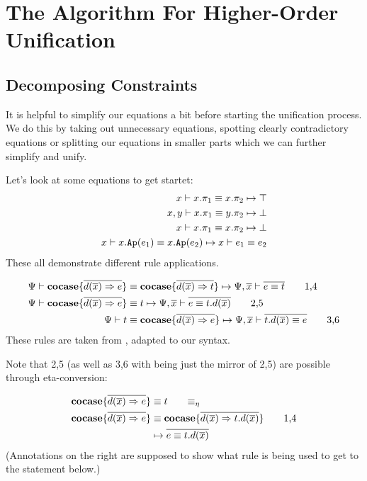 \documentclass[twoside,12pt,a4paper]{article}
\begin{document}
\section{The Algorithm For Higher-Order Unification}

\subsection{Decomposing Constraints}

It is helpful to simplify our equations a bit before starting the unification process.
We do this by taking out unnecessary equations, spotting clearly contradictory equations or splitting our equations in smaller parts which we can further simplify and unify.

Let's look at some equations to get startet:
\begin{align*}
    x \vdash x.\pi_1 \equiv x.\pi_2 \mapsto \top\\
    x,y \vdash x.\pi_1 \equiv y.\pi_2 \mapsto \bot \\
    x \vdash x.\pi_1 \equiv x.\pi_2 \mapsto \bot \\
    x \vdash x.\texttt{Ap}(e_1)\equiv x.\texttt{Ap}(e_2) \mapsto x\vdash e_1\equiv e_2
\end{align*}
These all demonstrate different rule applications.

\begin{align*}
    \Psi\vdash \textbf{cocase}\{\overline{d(\overline{x})\Rightarrow e}\}&\equiv 
    \textbf{cocase}\{\overline{d(\overline{x})\Rightarrow t}\}
    \mapsto \Psi, \overline{x}\vdash \overline{e \equiv t}\tag*{1,4}\\
    \Psi\vdash \textbf{cocase}\{\overline{d(\overline{x})\Rightarrow e}\}&\equiv t 
    \mapsto \Psi,\overline{x} \vdash\overline{e \equiv t.d(\overline{x})} \tag*{2,5}\\
    \Psi\vdash t&\equiv \textbf{cocase}\{\overline{d(\overline{x})\Rightarrow e}\} 
    \mapsto \Psi, \overline{x}\vdash \overline{t.d(\overline{x}) \equiv e} \tag*{3,6}
\end{align*}
These rules are taken from \cite{10.5555/2021953.2021960}, adapted to our syntax. 

Note that 2,5 (as well as 3,6 with being just the mirror of 2,5) are possible through eta-conversion:

\begin{align*}
    \excopatmatch{\overline{d(\overline{x})\Rightarrow e}}&\equiv t \tag*{$\equiv_{\eta}$}\\
    \excopatmatch{\overline{d(\overline{x})\Rightarrow e}}&\equiv \excopatmatch{\overline{d(\overline{x})\Rightarrow t.d(\overline{x})}} \tag*{1,4}\\
    &\mapsto \overline{e \equiv t.d(\overline{x})}
\end{align*}
(Annotations on the right are supposed to show what rule is being used to get to the statement below.)
\end{document}
